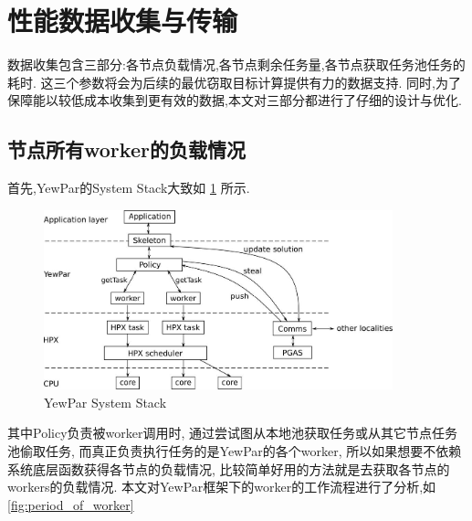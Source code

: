 \documentclass{mproj}
\begin{document}

\section{性能数据收集与传输}
数据收集包含三部分:各节点负载情况,各节点剩余任务量,各节点获取任务池任务的耗时.
这三个参数将会为后续的最优窃取目标计算提供有力的数据支持.
同时,为了保障能以较低成本收集到更有效的数据,本文对三部分都进行了仔细的设计与优化.

\subsection{节点所有worker的负载情况}
首先,YewPar的System Stack大致如
\cref{fig:yewpar_system_stack}
\cite{10.1007/978-3-030-29400-7_14}
所示.

\begin{figure}[h] %
    \centering %
    \includegraphics[width=0.9\textwidth]{images/YewPar_System_Stack.jpg} %
    \caption{YewPar System Stack} %
    \label{fig:yewpar_system_stack} %
\end{figure}
\FloatBarrier

其中Policy负责被worker调用时,
通过尝试图从本地池获取任务或从其它节点任务池偷取任务,
而真正负责执行任务的是YewPar的各个worker,
所以如果想要不依赖系统底层函数获得各节点的负载情况,
比较简单好用的方法就是去获取各节点的workers的负载情况.
本文对YewPar框架下的worker的工作流程进行了分析,如\cref{fig:period_of_worker}
\end{document}
